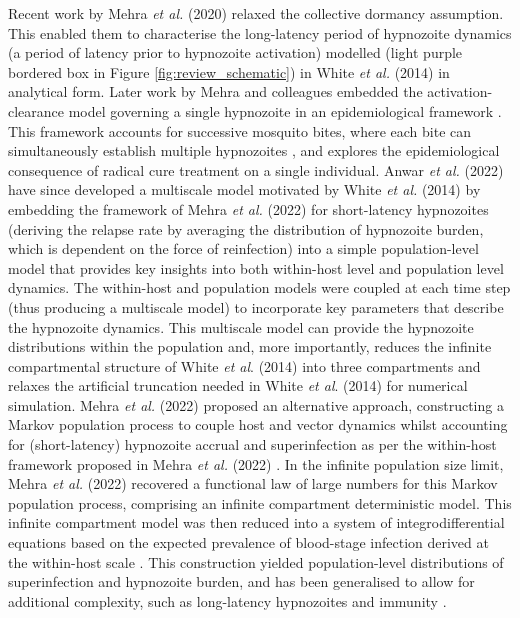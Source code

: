 \documentclass[12pt]{article}
\newcommand{\etal}{\textit{et al. }}
\begin{document}
Recent work by Mehra \textit{et al.} (2020) \cite{mehra2020activation}  relaxed the collective dormancy assumption. This enabled them to characterise the long-latency period of hypnozoite dynamics (a period of latency prior to hypnozoite activation) modelled (light purple bordered box in Figure \ref{fig:review_schematic}) in White \textit{et al.} (2014) \cite{white2014modelling} in analytical form. Later work by Mehra and colleagues embedded the activation-clearance model governing a single hypnozoite in an epidemiological framework \cite{mehra2022hypnozoite}. This framework accounts for successive mosquito bites, where each bite can simultaneously establish multiple hypnozoites \cite{mehra2021antibody,mehra2022hypnozoite}, and explores the epidemiological consequence of radical cure treatment on a single individual. Anwar \textit{et al.} (2022) \cite{anwar2022multiscale} have since developed a multiscale model motivated by White \etal(2014) \cite{white2014modelling} by embedding the framework of Mehra \textit{et al.} (2022) \cite{mehra2022hypnozoite} for short-latency hypnozoites (deriving the relapse rate by averaging the distribution of hypnozoite burden, which is dependent on the force of reinfection) into a simple population-level model that provides key insights into both within-host level and population level dynamics. The within-host and population models were coupled at each time step (thus producing a multiscale model) to incorporate key parameters that describe the hypnozoite dynamics. This multiscale model can provide the hypnozoite distributions within the population and, more importantly, reduces the infinite compartmental structure of White \textit{et al}. (2014) \cite{white2014modelling} into three compartments and relaxes the artificial truncation needed in White \textit{et al}. (2014) \cite{white2014modelling} for numerical simulation. Mehra \textit{et al.} (2022) \cite{thesis_somya} proposed an alternative approach, constructing a Markov population process to couple host and vector dynamics whilst accounting for (short-latency) hypnozoite accrual and superinfection as per the within-host framework proposed in Mehra \textit{et al.} (2022) \cite{mehra2022hypnozoite}. In the infinite population size limit, Mehra \textit{et al.} (2022) \cite{thesis_somya} recovered a functional law of large numbers for this Markov population process, comprising an infinite compartment deterministic model. This infinite compartment model was then reduced into a system of integrodifferential equations based on the expected prevalence of blood-stage infection derived at the within-host scale \cite{mehra2022hypnozoite}. This construction yielded population-level distributions of superinfection and hypnozoite burden, and has been generalised to allow for additional complexity, such as long-latency hypnozoites and immunity \cite{thesis_somya}.
 
\end{document}
